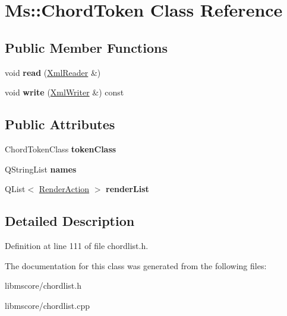 \hypertarget{class_ms_1_1_chord_token}{}\section{Ms\+:\+:Chord\+Token Class Reference}
\label{class_ms_1_1_chord_token}
\subsection*{Public Member Functions}
\begin{DoxyCompactItemize}
\item 
\mbox{\label{class_ms_1_1_chord_token_a3b59584f186db0cfa1a9f34f8c7c9571}} 
void {\bfseries read} (\hyperlink{class_ms_1_1_xml_reader}{Xml\+Reader} \&)
\item 
\mbox{\label{class_ms_1_1_chord_token_a32e04c976d19fd69771c9b66b83d5b90}} 
void {\bfseries write} (\hyperlink{class_ms_1_1_xml_writer}{Xml\+Writer} \&) const
\end{DoxyCompactItemize}
\subsection*{Public Attributes}
\begin{DoxyCompactItemize}
\item 
\mbox{\label{class_ms_1_1_chord_token_a56c94277f8a91e9413514d808ed2b683}} 
Chord\+Token\+Class {\bfseries token\+Class}
\item 
\mbox{\label{class_ms_1_1_chord_token_a46e6f5ab1b62728d8a1d6f2de61de53f}} 
Q\+String\+List {\bfseries names}
\item 
\mbox{\label{class_ms_1_1_chord_token_a4c26763378c1a88dd75e2e41354dc3cb}} 
Q\+List$<$ \hyperlink{struct_ms_1_1_render_action}{Render\+Action} $>$ {\bfseries render\+List}
\end{DoxyCompactItemize}


\subsection{Detailed Description}


Definition at line 111 of file chordlist.\+h.



The documentation for this class was generated from the following files\+:\begin{DoxyCompactItemize}
\item 
libmscore/chordlist.\+h\item 
libmscore/chordlist.\+cpp\end{DoxyCompactItemize}
